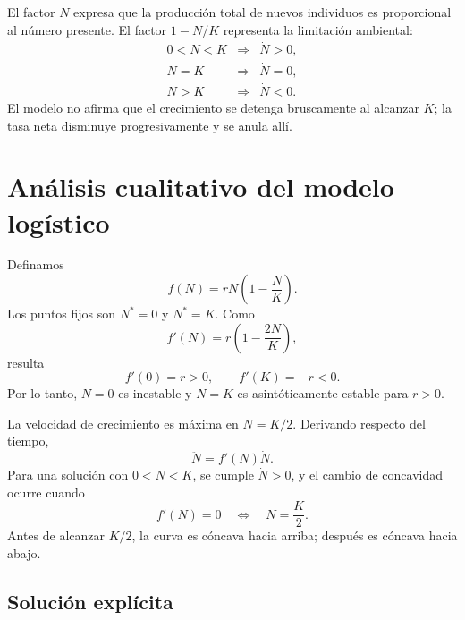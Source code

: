 \documentclass[12pt,a4paper]{article}
\begin{document}
	El factor \(N\) expresa que la producción total de nuevos individuos es proporcional al número presente. El factor \(1-N/K\) representa la limitación ambiental:
	\[
	\begin{array}{ccl}
	0<N<K &\Longrightarrow& \dot N>0,\\[1mm]
	N=K   &\Longrightarrow& \dot N=0,\\[1mm]
	N>K   &\Longrightarrow& \dot N<0.
	\end{array}
	\]
El modelo no afirma que el crecimiento se detenga bruscamente al alcanzar \(K\); la tasa neta disminuye progresivamente y se anula allí.

	\clearpage
	\section{Análisis cualitativo del modelo logístico}

	Definamos
	\[
	f(N)=rN\left(1-\frac{N}{K}\right).
	\]
Los puntos fijos son \(N^\ast=0\) y \(N^\ast=K\). Como
	\[
	f'(N)=r\left(1-\frac{2N}{K}\right),
	\]
resulta
	\[
	f'(0)=r>0,
	\qquad
	f'(K)=-r<0.
	\]
Por lo tanto, \(N=0\) es inestable y \(N=K\) es asintóticamente estable para \(r>0\).

	\begin{center}
	\end{center}

	La velocidad de crecimiento es máxima en \(N=K/2\). Derivando respecto del tiempo,
	\[
	\ddot N=f'(N)\dot N.
	\]
Para una solución con \(0<N<K\), se cumple \(\dot N>0\), y el cambio de concavidad ocurre cuando
	\[
	f'(N)=0
	\quad\Longleftrightarrow\quad
	N=\frac K2.
	\]
Antes de alcanzar \(K/2\), la curva es cóncava hacia arriba; después es cóncava hacia abajo.

	\subsection{Solución explícita}
\end{document}
